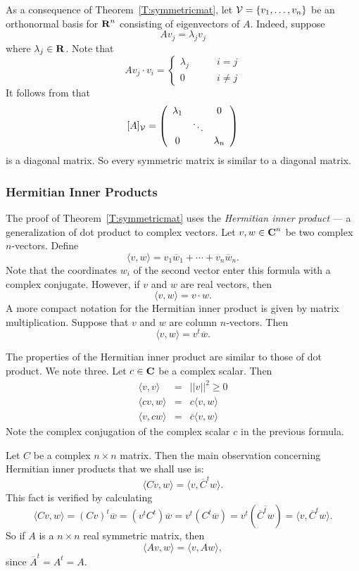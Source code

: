As a consequence of Theorem~\ref{T:symmetricmat}, let
${\cal V}=\{v_1,\ldots,v_n\}$ be an orthonormal basis for $\mbox{$\bf{R}$}^n$
consisting of eigenvectors of $A$.  Indeed, suppose
\[
Av_j = \lambda_jv_j
\]
where $\lambda_j\in\mbox{$\bf{R}$}$.  Note that
\[
Av_j\cdot v_i =  \left\{\begin{array}{rl} \lambda_j & \qquad i=j\\
			0 & \qquad i\neq j \end{array}\right.
\]
It follows from  that
\[
[A]_{\cal V}= \left(\begin{array}{ccc} \lambda_1 & & 0 \\  & \ddots & \\
	0 &  & \lambda_n \end{array}\right)
\]
is a diagonal matrix.  So every symmetric matrix is similar to a diagonal
matrix.

\subsubsection*{Hermitian Inner Products}

The proof of Theorem~\ref{T:symmetricmat} uses the {\em Hermitian inner
product} --- a generalization of
dot product to complex vectors.
Let $v,w\in\mbox{$\bf{C}$}^n$ be two complex $n$-vectors.  Define
\[
\langle v,w \rangle = v_1\overline{w}_1 + \cdots + v_n\overline{w}_n.
\]
Note that the coordinates $w_i$ of the second vector enter this formula
with a complex conjugate.  However, if $v$ and $w$ are real vectors, then
\[
\langle v,w \rangle = v\cdot w.
\]
A more compact notation for the Hermitian inner product is given by
matrix multiplication.
Suppose that $v$ and $w$ are column $n$-vectors.
Then
\[
\langle v,w \rangle = v^t\overline{w}.
\]

The properties of the Hermitian inner product are similar to those of dot
product.  We note three.  Let $c\in\mbox{$\bf{C}$}$ be a complex scalar.  Then
\begin{eqnarray*}
\langle v,v \rangle & = & ||v||^2\ge 0\\
\langle cv,w \rangle & = & c\langle v,w \rangle \\
\langle v,cw \rangle & = & \overline{c} \langle v,w \rangle
\end{eqnarray*}
Note the complex conjugation of the complex scalar $c$ in the previous
formula.

Let $C$ be a complex $n\times n$ matrix.  Then the main observation
concerning Hermitian inner products that we shall use is:
\[
\langle Cv,w \rangle = \langle v,\overline{C}^tw \rangle.
\]
This fact is verified by calculating
\[
\langle Cv,w \rangle = (Cv)^t\overline{w} = (v^tC^t)\overline{w}
= v^t(C^t\overline{w}) = v^t(\overline{\overline{C}^tw})
= \langle v,\overline{C}^tw \rangle.
\]
So if $A$ is a $n\times n$ real symmetric matrix, then
\begin{equation}   \label{e:symminv}
\langle Av,w \rangle = \langle v,Aw \rangle,
\end{equation}
since $\overline{A}^t= A^t = A$.

